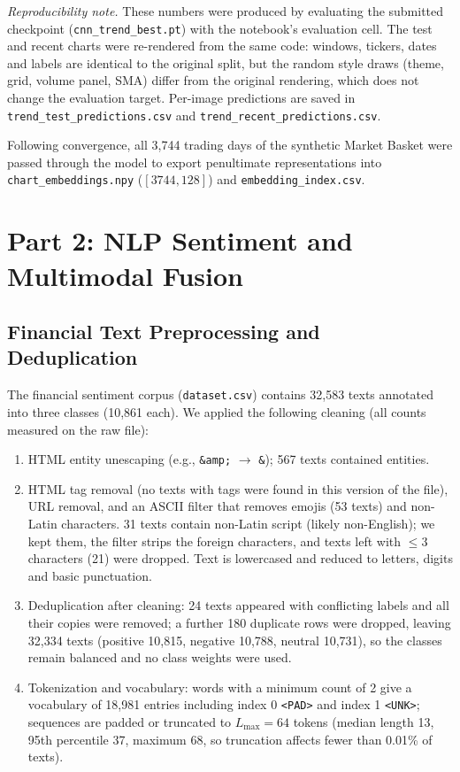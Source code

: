 \documentclass[10pt,journal]{IEEEtran}
\begin{document}
\emph{Reproducibility note.} These numbers were produced by evaluating the submitted checkpoint (\texttt{cnn\_trend\_best.pt}) with the notebook's evaluation cell. The test and recent charts were re-rendered from the same code: windows, tickers, dates and labels are identical to the original split, but the random style draws (theme, grid, volume panel, SMA) differ from the original rendering, which does not change the evaluation target. Per-image predictions are saved in \texttt{trend\_test\_predictions.csv} and \texttt{trend\_recent\_predictions.csv}.

Following convergence, all 3,744 trading days of the synthetic Market Basket were passed through the model to export penultimate representations into \texttt{chart\_embeddings.npy} ($[3744, 128]$) and \texttt{embedding\_index.csv}.

\section{Part 2: NLP Sentiment and Multimodal Fusion}
\label{sec:part2}

\subsection{Financial Text Preprocessing and Deduplication}
The financial sentiment corpus (\texttt{dataset.csv}) contains 32,583 texts annotated into three classes (10,861 each). We applied the following cleaning (all counts measured on the raw file):
\begin{enumerate}
  \item HTML entity unescaping (e.g., \texttt{\&amp;} $\rightarrow$ \texttt{\&}); 567 texts contained entities.
  \item HTML tag removal (no texts with tags were found in this version of the file), URL removal, and an ASCII filter that removes emojis (53 texts) and non-Latin characters. 31 texts contain non-Latin script (likely non-English); we kept them, the filter strips the foreign characters, and texts left with $\le 3$ characters (21) were dropped. Text is lowercased and reduced to letters, digits and basic punctuation.
  \item Deduplication after cleaning: 24 texts appeared with conflicting labels and all their copies were removed; a further 180 duplicate rows were dropped, leaving 32,334 texts (positive 10,815, negative 10,788, neutral 10,731), so the classes remain balanced and no class weights were used.
  \item Tokenization and vocabulary: words with a minimum count of 2 give a vocabulary of 18,981 entries including index 0 \texttt{<PAD>} and index 1 \texttt{<UNK>}; sequences are padded or truncated to $L_{\text{max}} = 64$ tokens (median length 13, 95th percentile 37, maximum 68, so truncation affects fewer than 0.01\% of texts).
\end{enumerate}
\end{document}
